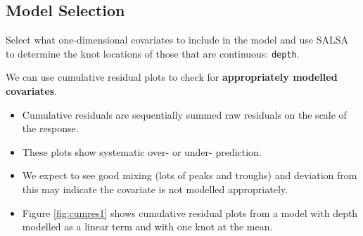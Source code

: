 \clearpage

\subsection{Model Selection}
\label{subsec:offmodseln}
\begin{frame}[fragile]
Select what one-dimensional covariates to include in the model and use SALSA to determine the knot locations of those that are continuous: {\tt depth}.

\noindent We can use cumulative residual plots to check for \textbf{appropriately modelled covariates}.  
\begin{itemize}
\item Cumulative residuals are sequentially summed raw residuals on the scale of the response.
\item These plots show systematic over- or under- prediction.  
\item We expect to see good mixing (lots of peaks and troughs) and deviation from this may indicate the covariate is not modelled appropriately.
\item Figure \ref{fig:cumres1} shows cumulative residual plots from a model with depth modelled as a linear term and with one knot at the mean.
\end{itemize} 
\end{frame}

